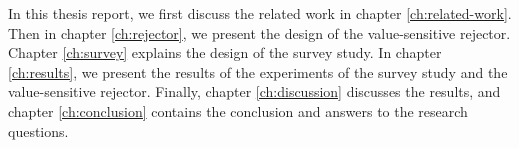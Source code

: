 
%
In this thesis report, we first discuss the related work in chapter \ref{ch:related-work}.
%
Then in chapter \ref{ch:rejector}, we present the design of the value-sensitive rejector.
%
Chapter \ref{ch:survey} explains the design of the survey study.
%
In chapter \ref{ch:results}, we present the results of the experiments of the survey study and the value-sensitive rejector.
%
Finally, chapter \ref{ch:discussion} discusses the results, and chapter \ref{ch:conclusion} contains the conclusion and answers to the research questions.
